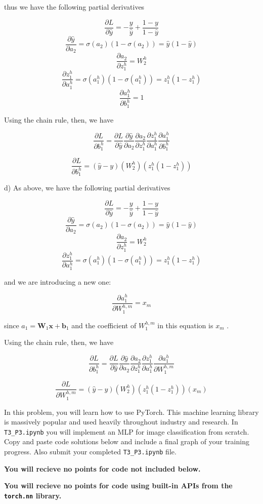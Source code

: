 \documentclass[submit]{harvardml}
\begin{document}
\begin{enumerate}
thus we have the following partial derivatives

$$\frac{\partial L}{\partial\hat{y}}= -\frac{y}{\hat{y}} + \frac{1-y}{1-\hat{y}}$$
$$\frac{\partial\hat{y}}{\partial a_2}=\sigma(a_2)(1-\sigma(a_2))=\hat{y}(1-\hat{y})$$
$$\frac{\partial a_2}{\partial z_1^h} = W_2^h$$
$$\frac{\partial z^h_1}{\partial a_1^h} = \sigma(a_1^h)(1-\sigma(a_1^h))=z_1^h(1-z_1^h)$$
$$\frac{\partial a_1^h}{\partial b_1^h} = 1$$

Using the chain rule, then, we have

$$\frac{\partial L}{\partial b_1^h}=\frac{\partial L}{\partial\hat{y}}\frac{\partial\hat{y}}{\partial a_2}\frac{\partial a_2}{\partial z_1^h}\frac{\partial z_1^h}{\partial a_1^h} \frac{\partial a_1^h}{\partial b_1^h}$$

$$\boxed{
    \frac{\partial L}{\partial b_1^h}
    = (\hat{y}-y)
    (W_2^h)
    (z_1^h(1-z_1^h)) 
}
$$

d) As above, we have the following partial derivatives

$$\frac{\partial L}{\partial\hat{y}}= -\frac{y}{\hat{y}} + \frac{1-y}{1-\hat{y}}$$
$$\frac{\partial\hat{y}}{\partial a_2}=\sigma(a_2)(1-\sigma(a_2))=\hat{y}(1-\hat{y})$$
$$\frac{\partial a_2}{\partial z_1^h} = W_2^h$$
$$\frac{\partial z^h_1}{\partial a_1^h} = \sigma(a_1^h)(1-\sigma(a_1^h))=z_1^h(1-z_1^h)$$

and we are introducing a new one:

$$\frac{\partial a_1^h}{\partial W_1^{h, m}} = x_m$$

since $a_1 = \mathbf{W}_1\mathbf{x}+\mathbf{b}_1$ and the coefficient of $W_1^{h, m}$ in this equation
is $x_m$ .

Using the chain rule, then, we have

$$\frac{\partial L}{\partial b_1^h}=\frac{\partial L}{\partial\hat{y}}\frac{\partial\hat{y}}{\partial a_2}\frac{\partial a_2}{\partial z_1^h}\frac{\partial z_1^h}{\partial a_1^h} \frac{\partial a_1^h}{\partial W_1^{h, m}}$$

$$\boxed{
    \frac{\partial L}{\partial W_1^{h, m}}
    = (\hat{y}-y)
    (W_2^h)
    (z_1^h(1-z_1^h)) 
    (x_m)
}
$$
\end{enumerate}


\newpage

\begin{problem}
  In this problem, you will learn how to use PyTorch. This machine learning library is massively popular and used heavily throughout industry and research. In \verb|T3_P3.ipynb| you will implement an MLP for image classification from scratch. Copy and paste code solutions below and include a final graph of your training progress. Also submit your completed \verb|T3_P3.ipynb| file.

  {\bfseries You will recieve no points for code not included below.}

  {\bfseries You will recieve no points for code using built-in APIs from the \verb|torch.nn| library.}
  
\end{problem}
\end{document}
